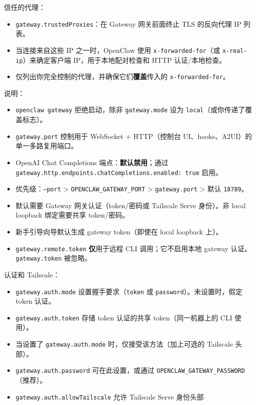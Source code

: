 信任的代理：

\begin{itemize}
  \item \texttt{gateway.trustedProxies}：在 Gateway 网关前面终止 TLS 的反向代理 IP 列表。
  \item 当连接来自这些 IP 之一时，OpenClaw 使用 \texttt{x-forwarded-for}（或 \texttt{x-real-ip}）来确定客户端 IP，用于本地配对检查和 HTTP 认证/本地检查。
  \item 仅列出你完全控制的代理，并确保它们\textbf{覆盖}传入的 \texttt{x-forwarded-for}。
\end{itemize}


说明：

\begin{itemize}
  \item \texttt{openclaw gateway} 拒绝启动，除非 \texttt{gateway.mode} 设为 \texttt{local}（或你传递了覆盖标志）。
  \item \texttt{gateway.port} 控制用于 WebSocket + HTTP（控制台 UI、hooks、A2UI）的单一多路复用端口。
  \item OpenAI Chat Completions 端点：\textbf{默认禁用}；通过 \texttt{gateway.http.endpoints.chatCompletions.enabled: true} 启用。
  \item 优先级：\texttt{--port} > \texttt{OPENCLAW\_GATEWAY\_PORT} > \texttt{gateway.port} > 默认 \texttt{18789}。
  \item 默认需要 Gateway 网关认证（token/密码或 Tailscale Serve 身份）。非 local loopback 绑定需要共享 token/密码。
  \item 新手引导向导默认生成 gateway token（即使在 local loopback 上）。
  \item \texttt{gateway.remote.token} \textbf{仅}用于远程 CLI 调用；它不启用本地 gateway 认证。\texttt{gateway.token} 被忽略。
\end{itemize}


认证和 Tailscale：

\begin{itemize}
  \item \texttt{gateway.auth.mode} 设置握手要求（\texttt{token} 或 \texttt{password}）。未设置时，假定 token 认证。
  \item \texttt{gateway.auth.token} 存储 token 认证的共享 token（同一机器上的 CLI 使用）。
  \item 当设置了 \texttt{gateway.auth.mode} 时，仅接受该方法（加上可选的 Tailscale 头部）。
  \item \texttt{gateway.auth.password} 可在此设置，或通过 \texttt{OPENCLAW\_GATEWAY\_PASSWORD}（推荐）。
  \item \texttt{gateway.auth.allowTailscale} 允许 Tailscale Serve 身份头部
\end{itemize}

